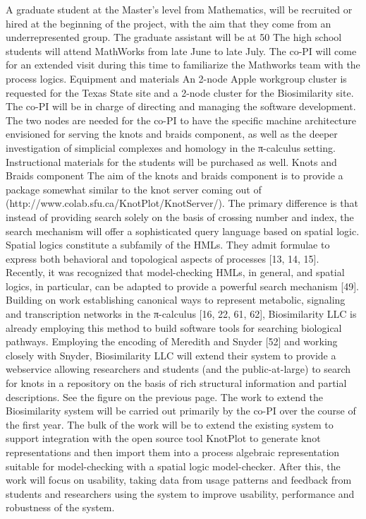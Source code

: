 \documentclass[12pt]{amsart}
\begin{document}
A graduate student at the Master’s level from Mathematics, will be recruited or hired at the beginning of the project, with the aim that they come from an underrepresented group. The graduate assistant will be at 50%
The high school students will attend MathWorks from late June to late July. The co-PI will come for an extended visit during this time to familiarize the Mathworks team with the process logics.
Equipment and materials
An 2-node Apple workgroup cluster is requested for the Texas State site and a 2-node cluster for the Biosimilarity site. The co-PI will be in charge of directing and managing the software development. The two nodes are needed for the co-PI to have the specific machine architecture envisioned for serving the knots and braids component, as well as the deeper investigation of simplicial complexes and homology in the π-calculus setting. Instructional materials for the students will be purchased as well.
Knots and Braids component
The aim of the knots and braids component is to provide a package somewhat similar to the knot server coming out of (http://www.colab.sfu.ca/KnotPlot/KnotServer/). The primary difference is that instead of providing search solely on the basis of crossing number and index, the search mechanism will offer a sophisticated query language based on spatial logic. Spatial logics constitute a subfamily of the HMLs. They admit formulae to express both behavioral and topological aspects of processes [13, 14, 15]. Recently, it was recognized that model-checking HMLs, in general, and spatial logics, in particular, can be adapted to provide a powerful search mechanism [49].  Building on work establishing canonical ways to represent metabolic, signaling and transcription networks in the π-calculus [16, 22, 61, 62], Biosimilarity LLC is already employing this method to build software tools for searching biological pathways. Employing the encoding of Meredith and Snyder [52] and working closely with Snyder, Biosimilarity LLC will extend their system to provide a webservice allowing researchers and students  (and the public-at-large) to search for knots in a repository on the basis of rich structural information and partial descriptions. See the figure on the previous page.
The work to extend the Biosimilarity system will be carried out primarily by the co-PI over the course of the first year. The bulk of the work will be to extend the existing system to support integration with the open source tool KnotPlot to generate knot representations and then import them into a process algebraic representation suitable for model-checking with a spatial logic model-checker. After this, the work will focus on usability, taking data from usage patterns and feedback from students and researchers using the system to improve usability, performance and robustness of the system.
\end{document}
